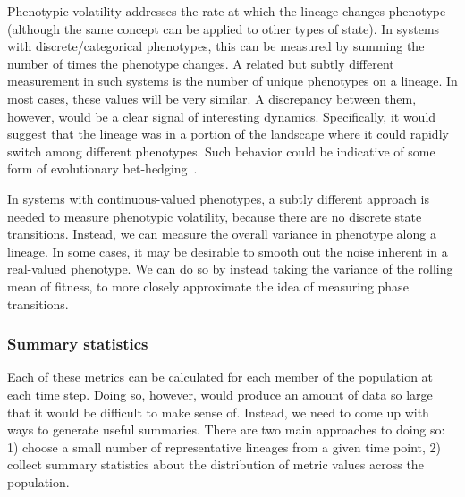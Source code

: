\documentclass[letterpaper]{article}
\begin{document}
Phenotypic volatility addresses the rate at which the lineage changes phenotype (although the same concept can be applied to other types of state). In systems with discrete/categorical phenotypes, this can be measured by summing the number of times the phenotype changes. A related but subtly different measurement in such systems is the number of unique phenotypes on a lineage. In most cases, these values will be very similar. A discrepancy between them, however, would be a clear signal of interesting dynamics. Specifically, it would suggest that the lineage was in a portion of the landscape where it could rapidly switch among different phenotypes. Such behavior could be indicative of some form of evolutionary bet-hedging~\citep{beaumont2009experimental}. %

In systems with continuous-valued phenotypes, a subtly different approach is needed to measure phenotypic volatility, because there are no discrete state transitions. Instead, we can measure the overall variance in phenotype along a lineage. In some cases, it may be desirable to smooth out the noise inherent in a real-valued phenotype. We can do so by instead taking the variance of the rolling mean of fitness, to more closely approximate the idea of measuring phase transitions.


\subsubsection{Summary statistics}

Each of these metrics can be calculated for each member of the population at each time step. Doing so, however, would produce an amount of data so large that it would be difficult to make sense of. Instead, we need to come up with ways to generate useful summaries. There are two main approaches to doing so: 1) choose a small number of representative lineages from a given time point, 2) collect summary statistics about the distribution of metric values across the population.
\end{document}
